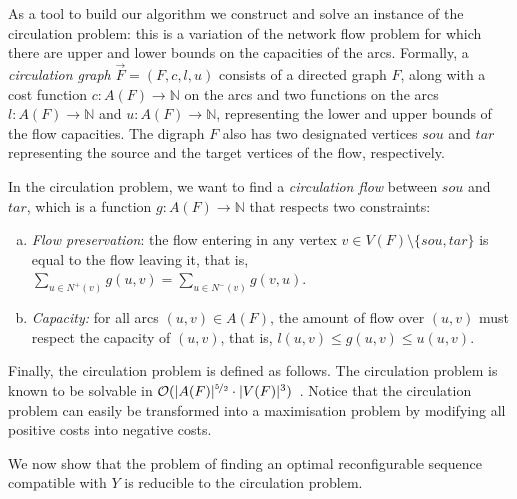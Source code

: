 %

As a tool to build our algorithm we construct and solve an instance of the circulation problem: this is a variation of the network flow problem for which there are upper and lower bounds on the capacities of the arcs. Formally, a \emph{circulation graph} $\overrightarrow{F}=(F,c,l,u)$ consists of a directed graph $F$, along with a cost function $c : A(F) \to \mathbb{N}$ on the arcs and two functions on the arcs $l : A(F) \to \mathbb{N}$ and $u : A(F) \to \mathbb{N}$, representing the lower and upper bounds of the flow capacities. The digraph $F$ also has two designated vertices $sou$ and $tar$ representing the source and the target vertices of the flow, respectively.

In the circulation problem, we want to find a \emph{circulation flow} between $sou$ and $tar$, which is a function $g : A(F) \to \mathbb{N}$ that respects two constraints:
\begin{enumerate}[(a)]
  \item \emph{Flow preservation}: the flow entering in any vertex $v \in V(F) \setminus \{sou,tar\}$ is equal to the flow leaving it, that is, $\sum\limits_{u \in N^+(v)} g(u,v) = \sum\limits_{u \in N^-(v)} g(v,u)$.
  \item \emph{Capacity:} for all arcs $(u,v) \in A(F)$, the amount of flow over $(u,v)$ must respect the capacity of $(u,v)$, that is, $l(u,v) \leq g(u,v) \leq u(u,v)$.
\end{enumerate}
%
Finally, the circulation problem is defined as follows.
The circulation problem is known to be solvable in $\mathcal{O}(|A(F)|^{\nicefrac{5}{2}}\cdot |V(F)|^3)$~\cite{Tardos85}. Notice that the circulation problem can easily be transformed into a maximisation problem by modifying all positive costs into negative costs.

We now show that the problem of finding an optimal reconfigurable sequence compatible with $Y$ is reducible to the circulation problem.

